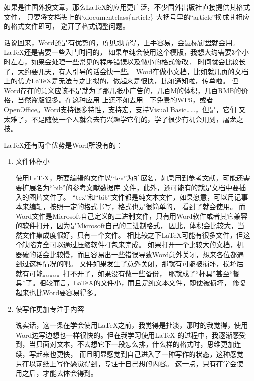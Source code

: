 如果是往国外投文章，那么\LaTeX{}的应用更广泛，不少国外出版社直接提供其格式文件，
只要将文档头上的$\backslash$documentclass\{article\} 大括号里的“article”换成其相应的格式文件即可，
避开了格式调整问题。

话说回来，Word还是有优势的，所见即所得，上手容易，会鼠标键盘就会用。\LaTeX{}还是需要一些入门时间的，
如果单纯会使用这个模版，我想大约需要3个小时左右，如果会处理一些常见的程序错误以及做小的格式修改，
时间就会比较长了，大约要几天，有人引导的话会快一些。
Word在做小文档，比如就几页的文档上的优势\LaTeX{}{}是无法与之比拟的，做起来是很快，比如通知啦，传单啦。
但Word存在的意义应该不是就为了那几张小广告的，几百M的体积，几百RMB的价格，当然盗版很多。在这种应用
上还不如去用一下免费的WPS，或者OpenOffice。Word支持很多特性，支持宏，支持Visual Basic……，但是，它们
又太难了，不是随便一个人就会去有兴趣学它们的，学了很少有机会用到，屠龙之技。

\LaTeX{}{}还有两个优势是Word所没有的：
\begin{enumerate}
\item{文件体积小}

使用\LaTeX{}{}，所要编辑的文件以“tex”为扩展名，如果用到参考文献，可能还需要扩展名为“bib”的参考文献数据库
文件，此外，还可能有的就是文档中要插入的图片文件了。
“tex”和“bib”文件都是纯文本文件，如果愿意，可以用记事本来编辑，按照一定的格式书写，格式也是很简单的，
看到了就会使用。
而Word文件是Microsoft自己定义的二进制文件，只有用Word软件或者其它兼容的软件打开，因为是Microsoft自己的二进制格式，
因此，体积会比较大，当然文件集成度很好，只有一个文件。
相比较之下\LaTeX{}{}可能有很多文件，但这个缺陷完全可以通过压缩软件打包来完成。
如果打开一个比较大的文档，机器破的话会比较慢，而且容易出一些错误导致Word意外关闭，想来各位都遇到过这种情况的吧。
文件如果发生了意外关闭，那就有可能被损坏，损坏后就有可能。。。。。打不开了，如果没有做一些备份，
那就成了“杯具”甚至“餐具”了。相较而言，\LaTeX{}{}的文件小，而且是纯文本文件，即使被损坏，
修复起来也比Word要容易得多。

\item{使写作更加专注于内容}

说实话，这一条在学会使用\LaTeX{}{}之前，我觉得是扯淡，那时的我觉得，使用Word边写边想也一样很快的。但在我学习使用\LaTeX{}{}
的过程中，我逐渐感受到，当只面对文本，不去想它下一段怎么排，什么样的格式时，思维更加连续，写起来也更快，
而且明显感觉到自己进入了一种写作的状态，这种感觉只在以前纸上写作感觉得到，专注于自己想的内容。
这一点，只有在学会使用之后，才能去体会得到。

\end{enumerate}

